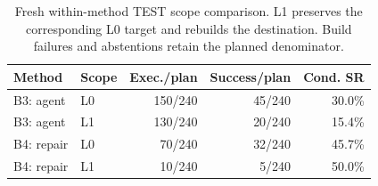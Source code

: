\begin{table}[t]
\centering\small
\caption{Fresh within-method TEST scope comparison. L1 preserves the corresponding L0 target and rebuilds the destination. Build failures and abstentions retain the planned denominator.}
\label{tab:native-test-scope}
\begin{tabular}{llrrr}
\toprule
Method & Scope & Exec./plan & Success/plan & Cond. SR \\
\midrule
B3: agent & L0 & 150/240 & 45/240 & 30.0\% \\
B3: agent & L1 & 130/240 & 20/240 & 15.4\% \\
B4: repair & L0 & 70/240 & 32/240 & 45.7\% \\
B4: repair & L1 & 10/240 & 5/240 & 50.0\% \\
\bottomrule
\end{tabular}
\end{table}
